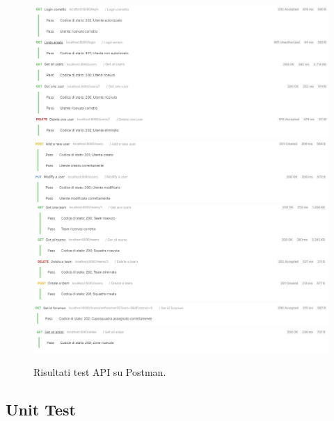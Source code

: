 \begin{itemize}
	\begin{figure}[h!]
		\centering
		\includegraphics[width=0.99\linewidth]{./Iterazione 2/ImageFiles/TestUserController1}
		\includegraphics[width=0.99\linewidth]{./Iterazione 2/ImageFiles/TestUserController2}
		\includegraphics[width=1\linewidth]{./Iterazione 2/ImageFiles/TestTeamController}
		\includegraphics[width=0.99\linewidth]{./Iterazione 2/ImageFiles/TestSetIdForeman}
		\includegraphics[width=1\linewidth]{./Iterazione 2/ImageFiles/TestAreaController}
		\caption{Risultati test API su Postman.}
		\label{fig:RisultatiTestAPIIT2}
	\end{figure}
\end{itemize}

\clearpage

\subsection{Unit Test}
